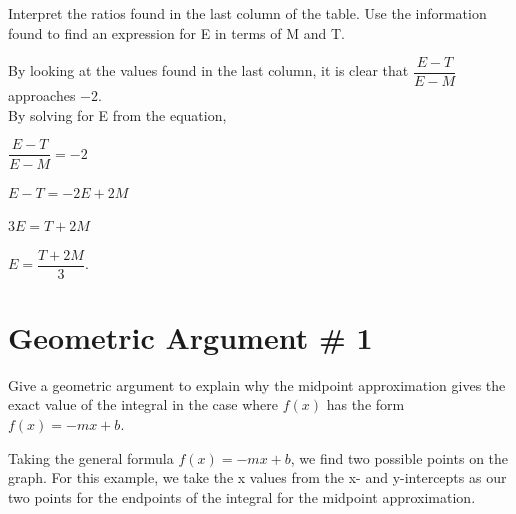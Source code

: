\documentclass[letterpaper,12pt]{article}
\theoremstyle{definition}
\begin{document}
\begin{large}

 Interpret the ratios found in the last column of the table. Use the information found to find an expression for E in terms of M and T.

\end{large}

\vspace{1cm}

By looking at the values found in the last column, it is clear that $\dfrac{E-T}{E-M}$ approaches $-2$.\\
By solving for E from the equation,

\vspace{0.7cm}
\centerline{$\dfrac{E-T}{E-M}=-2$}
\vspace{0.7cm}
\centerline{$E-T=-2E+2M$}
\vspace{0.7cm}
\centerline{$3E=T+2M$}
\vspace{0.7cm}
\centerline{$E=\dfrac{T+2M}{3}$.}

\pagebreak

\section{Geometric Argument \# 1}

\begin{large}

 Give a geometric argument to explain why the midpoint approximation gives the exact value of the integral in the case where $f(x)$ has the form $f(x)=-mx+b$.

\end{large}

\vspace{1cm}

Taking the general formula $f(x)=-mx+b$, we find two possible points on the graph. For this example, we take the x values from the x- and y-intercepts as our two points for the endpoints of the integral for the midpoint approximation.

\vspace{1cm}

\centering
\end{document}
